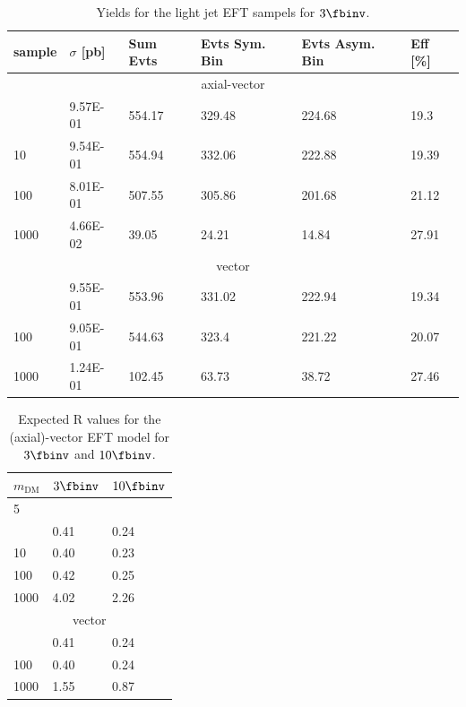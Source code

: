 \begin{table}[h]
\centering
\begin{tabular}{llllll}
\hline
sample             & $\sigma$ [pb] & Sum Evts       & Evts Sym. Bin & Evts Asym. Bin & Eff  [\%]   \\\hline
\multicolumn{6}{c}{axial-vector}        \\\line
1    & 9.57E-01 & 554.17 & 329.48 & 224.68 & 19.3  \\
10   & 9.54E-01 & 554.94 & 332.06 & 222.88 & 19.39 \\
100  & 8.01E-01 & 507.55 & 305.86 & 201.68 & 21.12 \\
1000 & 4.66E-02 & 39.05  & 24.21  & 14.84  & 27.91 \\
\multicolumn{6}{c}{vector}        \\\line
110    & 9.55E-01 & 553.96 & 331.02 & 222.94 & 19.34 \\
100   & 9.05E-01 & 544.63 & 323.4  & 221.22 & 20.07 \\
1000  & 1.24E-01 & 102.45 & 63.73  & 38.72  & 27.46 \\
\hline
\end{tabular}
\caption{Yields for the light jet EFT sampels for $3\fbinv$.} 
\label{tab:dm_mj_eft_yields}
\end{table}


\begin{table}[h]
\centering
\begin{tabular}{lll}\hline
$m_{\textrm{DM}}$& $3\fbinv$  & $10\fbinv$ \\\hline
5\multicolumn{3}{c}{axial-vector}        \\\line
1             & 0.41 & 0.24 \\
10            & 0.40 & 0.23 \\
100           & 0.42 & 0.25 \\
1000          & 4.02 & 2.26 \\\hline
\multicolumn{3}{c}{vector}        \\\line
10            & 0.41 & 0.24 \\
100           & 0.40 & 0.24 \\
1000          & 1.55 & 0.87\\
\hline
\end{tabular}
\caption{Expected R values for the (axial)-vector EFT model for $3\fbinv$ and $10\fbinv$.} 
\label{tab:dm_mj_eft_rvalues}
\end{table}


